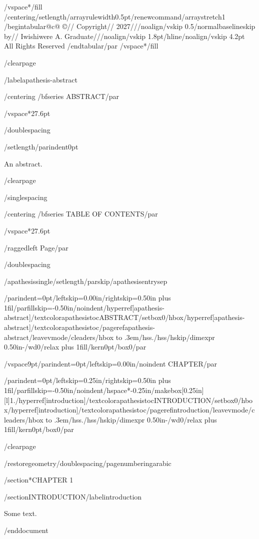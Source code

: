 /vspace*{/fill}
{/centering/setlength{/arrayrulewidth}{0.5pt}/renewcommand{/arraystretch}{1}
/begin{tabular}{@{}c@{}}
©//
Copyright//
2027///noalign{/vskip 0.5/normalbaselineskip}
by//
Iwishiwere A. Graduate///noalign{/vskip 1.8pt}/hline/noalign{/vskip 4.2pt}
All Rights Reserved
/end{tabular}/par}
/vspace*{/fill}

/clearpage

/label{apathesis-abstract}

{/centering
/bfseries ABSTRACT/par}

/vspace*{27.6pt}

/doublespacing

{/setlength{/parindent}{0pt}

An abstract.

}

/clearpage

/singlespacing

{/centering
/bfseries TABLE OF CONTENTS/par}

/vspace*{27.6pt}

{/raggedleft
Page/par}

/doublespacing

{/apathesissingle/setlength{/parskip}{/apathesisentrysep}

{/parindent=0pt/leftskip=0.00in/rightskip=0.50in plus 1fil/parfillskip=-0.50in/noindent/hyperref[apathesis-abstract]{/textcolor{apathesistoc}{ABSTRACT}}/setbox0/hbox{/hyperref[apathesis-abstract]{/textcolor{apathesistoc}{/pageref{apathesis-abstract}}}}/leavevmode/cleaders/hbox to .3em{/hss./hss}/hskip/dimexpr 0.50in-/wd0/relax plus 1fill/kern0pt/box0/par}

/vspace{9pt}{/parindent=0pt/leftskip=0.00in/noindent CHAPTER/par}

{/parindent=0pt/leftskip=0.25in/rightskip=0.50in plus 1fil/parfillskip=-0.50in/noindent/hspace*{-0.25in}/makebox[0.25in][l]{1.}/hyperref[introduction]{/textcolor{apathesistoc}{INTRODUCTION}}/setbox0/hbox{/hyperref[introduction]{/textcolor{apathesistoc}{/pageref{introduction}}}}/leavevmode/cleaders/hbox to .3em{/hss./hss}/hskip/dimexpr 0.50in-/wd0/relax plus 1fill/kern0pt/box0/par}

}

/clearpage

/restoregeometry/doublespacing/pagenumbering{arabic}

/section*{CHAPTER 1}

/section{INTRODUCTION}/label{introduction}

Some text.




/end{document}
